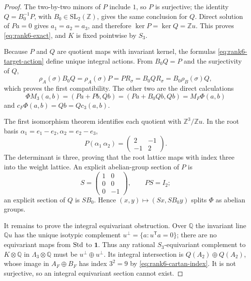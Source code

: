 \documentclass[11pt]{article}
\theoremstyle{definition}
\theoremstyle{remark}
\numberwithin{equation}{section}
\begin{document}
\begin{proof}
The two-by-two minors of \(P\) include \(1\), so \(P\) is surjective; the
identity \(Q=B_0^{-1}P\), with \(B_0\in\mathrm{SL}_2(\mathbb Z)\), gives
the same conclusion for \(Q\).  Direct solution of \(Pa=0\) gives
\(a_1=a_2=a_3\), and therefore
\(\ker P=\ker Q=\mathbb Zu\).  This proves
\eqref{eq:rank6-exact}, and \(K\) is fixed pointwise by \(S_3\).

Because \(P\) and \(Q\) are quotient maps with invariant kernel, the formulas
\eqref{eq:rank6-target-action} define unique integral actions.  From
\(B_0Q=P\) and the surjectivity of \(Q\),
\[
 \rho_A(\sigma)B_0Q=\rho_A(\sigma)P
 =PR_\sigma=B_0QR_\sigma=B_0\rho_B(\sigma)Q,
\]
which proves the first compatibility.  The other two are the direct
calculations
\[
 \Phi M_3(a,b)=(Pa+Pb,Qb)
 =(Pa+B_0Qb,Qb)=M_F\Phi(a,b)
\]
and \(c_F\Phi(a,b)=Qb=Qc_3(a,b)\).

The first isomorphism theorem identifies each quotient with
\(\mathbb Z^3/\mathbb Zu\).  In the root basis
\(\alpha_1=e_1-e_2,\alpha_2=e_2-e_3\),
\begin{equation}
 P(\alpha_1\ \alpha_2)
 =\begin{pmatrix}2&-1\\-1&2\end{pmatrix}.              \label{eq:rank6-cartan-index}
\end{equation}
The determinant is three, proving that the root lattice maps with index
three into the weight lattice.  An explicit abelian-group section of \(P\)
is
\[
 S=\begin{pmatrix}1&0\\0&0\\0&-1\end{pmatrix},
 \qquad PS=I_2;
\]
an explicit section of \(Q\) is \(SB_0\).  Hence
\((x,y)\mapsto(Sx,SB_0y)\) splits \(\Phi\) as abelian groups.

It remains to prove the integral equivariant obstruction.  Over \(\mathbb Q\)
the invariant line \(\mathbb Qu\) has the unique isotypic complement
\(u^\perp=\{a:u^{\mathsf T}a=0\}\); there are no equivariant maps from
\({\rm Std}\) to \(\mathbf1\).  Thus any rational \(S_3\)-equivariant
complement to \(K\otimes\mathbb Q\) in \(\Lambda_3\otimes\mathbb Q\) must
be \(u^\perp\oplus u^\perp\).  Its integral intersection is
\(Q(A_2)\oplus Q(A_2)\), whose image in \(A_F\oplus B_F\) has index
\(3^2=9\) by \eqref{eq:rank6-cartan-index}.  It is not surjective, so an
integral equivariant section cannot exist.
\end{proof}
\end{document}
